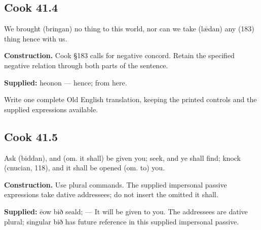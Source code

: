 \par\begin{minipage}{\linewidth}\raggedright
\subsection*{Cook 41.4}

We brought (bringan) no thing to this world, nor can we take (lǣdan) any (183) thing hence with us.

\textbf{Construction.} Cook §183 calls for negative concord. Retain the specified negative relation through both parts of the sentence.

\end{minipage}\par\addvspace{4pt}

\textbf{Supplied:} heonon — hence; from here.

Write one complete Old English translation, keeping the printed controls and the supplied expressions available.

\par\begin{minipage}{\linewidth}\raggedright
\subsection*{Cook 41.5}

Ask (biddan), and (om. it shall) be given you; seek, and ye shall find; knock (cnucian, 118), and it shall be opened (om. to) you.

\end{minipage}\par\addvspace{4pt}

\textbf{Construction.} Use plural commands. The supplied impersonal passive expressions take dative addressees; do not insert the omitted it shall.

\textbf{Supplied:} ēow bið seald; — It will be given to you. The addressees are dative plural; singular bið has future reference in this supplied impersonal passive.

